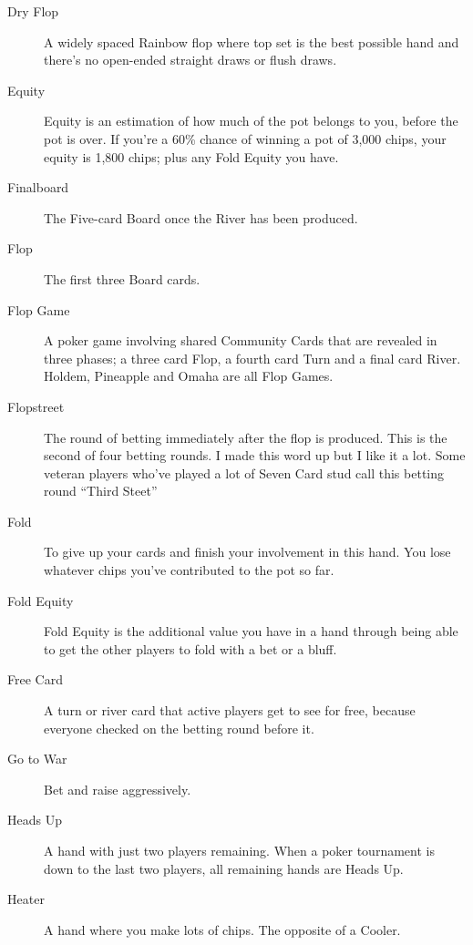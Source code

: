 \begin{description}
\item[Dry Flop] A widely spaced Rainbow flop where top set is the best
possible hand and there's no open-ended straight draws or flush
draws.

\item[Equity] Equity is an estimation of how much of the pot belongs
to you, before the pot is over. If you're a 60\% chance of winning a
pot of 3,000 chips, your equity is 1,800 chips; plus any Fold Equity
you have.

\item[Finalboard] The Five-card Board once the River has been
produced.

\item[Flop] The first three Board cards.

\item[Flop Game] A poker game involving shared Community Cards that
are revealed in three phases; a three card Flop, a fourth card Turn
and a final card River. Holdem, Pineapple and Omaha are all Flop
Games.

\item[Flopstreet] The round of betting immediately after the flop is
produced. This is the second of four betting rounds. I made this word
up but I like it a lot. Some veteran players who've played a lot of
Seven Card stud call this betting round ``Third Steet''

\item[Fold] To give up your cards and finish your involvement in this
hand. You lose whatever chips you've contributed to the pot so far.

\item[Fold Equity] Fold Equity is the additional value you have in a
hand through being able to get the other players to fold with a bet or
a bluff.

\item[Free Card] A turn or river card that active players get to see
for free, because everyone checked on the betting round before it.

\item[Go to War] Bet and raise aggressively.

\item[Heads Up] A hand with just two players remaining. When a poker
tournament is down to the last two players, all remaining hands are
Heads Up.

\item[Heater] A hand where you make lots of chips. The opposite of a
Cooler.


\end{description}
